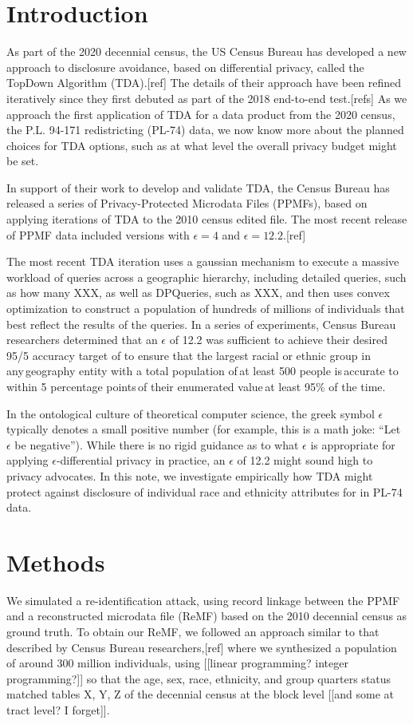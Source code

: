 \documentclass{article}
\begin{document}
\section{Introduction}
\label{introduction}
As part of the 2020 decennial census, the US Census Bureau has developed a new approach to disclosure avoidance, based on differential privacy, called the TopDown Algorithm (TDA).[ref]  The details of their approach have been refined iteratively since they first debuted as part of the 2018 end-to-end test.[refs]  As we approach the first application of TDA for a data product from the 2020 census, the P.L. 94-171 redistricting (PL-74) data, we now know more about the planned choices for TDA options, such as at what level the overall privacy budget might be set.

In support of their work to develop and validate TDA,  the Census Bureau has released a series of Privacy-Protected Microdata Files (PPMFs), based on applying iterations of TDA to the 2010 census edited file.  The most recent release of PPMF data included versions with $\epsilon=4$ and $\epsilon=12.2$.[ref]

The most recent TDA iteration uses a gaussian mechanism to execute a massive workload of queries across a geographic hierarchy, including detailed queries, such as how many XXX, as well as DPQueries, such as XXX, and then uses convex optimization to construct a population of hundreds of millions of individuals that best reflect the results of the queries.  In a series of experiments, Census Bureau researchers determined that an $\epsilon$ of 12.2 was sufficient to achieve their desired 95/5 accuracy target of to ensure that the largest racial or ethnic group in any geography entity with a total population of at least 500 people is accurate to within 5 percentage points of their enumerated value at least 95\% of the time.

In the ontological culture of theoretical computer science, the greek symbol $\epsilon$ typically denotes a small positive number (for example, this is a math joke: ``Let $\epsilon$ be negative'').  While there is no rigid guidance as to what $\epsilon$ is appropriate for applying $\epsilon$-differential privacy in practice, an $\epsilon$ of 12.2 might sound high to privacy advocates. In this note, we investigate empirically how TDA might protect against disclosure of individual race and ethnicity attributes for in PL-74 data.

\section{Methods}
We simulated a re-identification attack, using record linkage between the PPMF and a reconstructed microdata file (ReMF) based on the 2010 decennial census as ground truth. To obtain our ReMF, we followed an approach similar to that described by Census Bureau researchers,[ref] where we synthesized a population of around 300 million individuals, using [[linear programming?  integer programming?]] so that the age, sex, race, ethnicity, and group quarters status matched tables X, Y, Z of the decennial census at the block level [[and some at tract level? I forget]].
\end{document}
